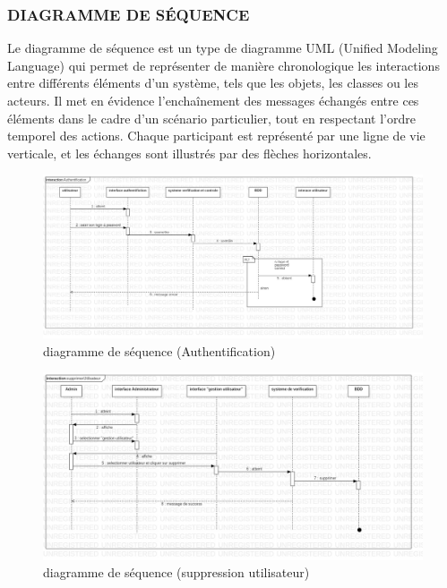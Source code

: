 \documentclass[english,12pt,a4paper]{report}
\begin{document}
\subsubsection{DIAGRAMME DE SÉQUENCE}
Le diagramme de séquence est un type de diagramme UML (Unified Modeling Language) qui permet de représenter de manière chronologique les interactions entre différents éléments d’un système, tels que les objets, les classes ou les acteurs. Il met en évidence l’enchaînement des messages échangés entre ces éléments dans le cadre d’un scénario particulier, tout en respectant l’ordre temporel des actions. Chaque participant est représenté par une ligne de vie verticale, et les échanges sont illustrés par des flèches horizontales. 
\begin{figure}[h]
	\centering
	\begin{center}
		\includegraphics*[height=0.3 \textheight]{AuthentificationSequence.jpg}
	\end{center}
	\caption{diagramme de séquence (Authentification)}
	\label{fig4: diagramme de sequence Authentification}
\end{figure}
\begin{figure}[h]
	\centering
	\includegraphics*[height=0.3 \textheight]{supprimerUtilisateurSequence.jpg}
	\caption{diagramme de séquence (suppression utilisateur)}
	\label{fig5:diagramme de séquence (suppression utilisateur)}
\end{figure}
\end{document}
